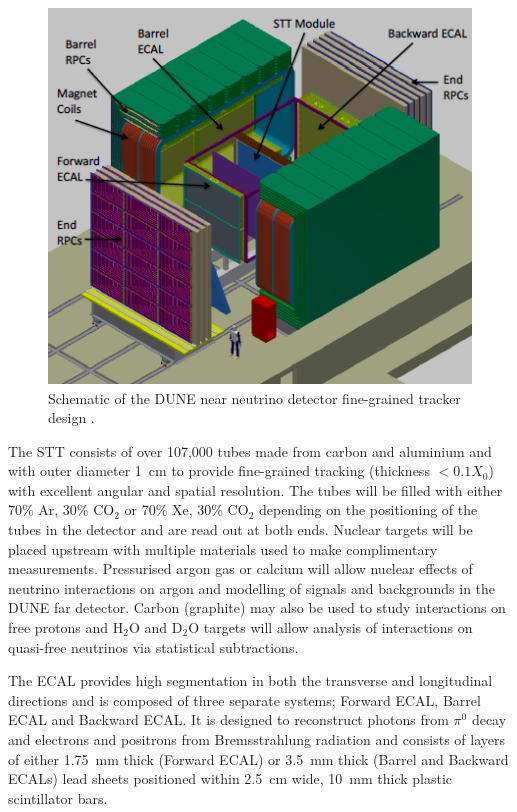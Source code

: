 \begin{figure}
  \centering
  \includegraphics[width=12cm]{DUNENearDetector.png}
  \caption[Schematic of the DUNE near neutrino detector fine-grained tracker design.]{Schematic of the DUNE near neutrino detector fine-grained tracker design \cite{DUNECDR4}.}
  \label{fig:DUNENearDetector}
\end{figure}

The STT consists of over 107,000 tubes made from carbon and aluminium and with outer diameter 1~cm to provide fine-grained tracking (thickness $<0.1X_0$) with excellent angular and spatial resolution.  The tubes will be filled with either 70\% Ar, 30\% CO$_2$ or 70\% Xe, 30\% CO$_2$ depending on the positioning of the tubes in the detector and are read out at both ends.  Nuclear targets will be placed upstream with multiple materials used to make complimentary measurements.  Pressurised argon gas or calcium will allow nuclear effects of neutrino interactions on argon and modelling of signals and backgrounds in the DUNE far detector.  Carbon (graphite) may also be used to study interactions on free protons and H$_2$O and D$_2$O targets will allow analysis of interactions on quasi-free neutrinos via statistical subtractions.

The ECAL provides high segmentation in both the transverse and longitudinal directions and is composed of three separate systems; Forward ECAL, Barrel ECAL and Backward ECAL.  It is designed to reconstruct photons from $\pi^0$ decay and electrons and positrons from Bremsstrahlung radiation and consists of layers of either 1.75~mm thick (Forward ECAL) or 3.5~mm thick (Barrel and Backward ECALs) lead sheets positioned within 2.5~cm wide, 10~mm thick plastic scintillator bars.

